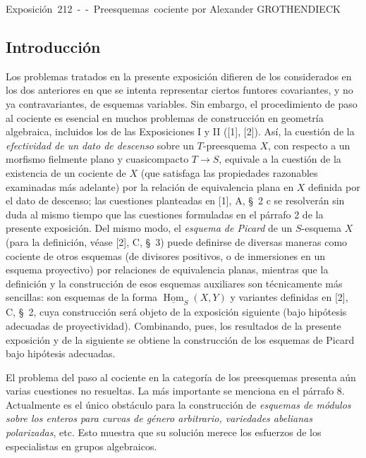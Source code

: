\unit{Exposición 212 -- Preesquemas cociente}
%
  {por Alexander GROTHENDIECK}

\subsection*{Introducción}

Los problemas tratados en la presente exposición difieren de los considerados en
los dos anteriores en que se intenta representar ciertos funtores covariantes,
y no ya contravariantes, de esquemas variables. Sin embargo, el procedimiento
de paso al cociente es esencial en muchos problemas de construcción en
geometría algebraica, incluidos los de las Exposiciones I y II ([1], [2]). Así, la
cuestión de la \emph{efectividad de un dato de descenso} sobre un
$T$-preesquema $X$, con respecto a un morfismo fielmente plano y cuasicompacto
$T\longrightarrow S$, equivale a la cuestión de la existencia de un cociente
de $X$ (que satisfaga las propiedades razonables examinadas más adelante) por
la relación de equivalencia plana en $X$ definida por el dato de descenso; las
cuestiones planteadas en [1], A, \S~2 c se resolverán sin duda al mismo tiempo
que las cuestiones formuladas en el párrafo 2 de la presente exposición. Del mismo
modo, el \emph{esquema de Picard} de un $S$-esquema $X$ (para la definición,
véase [2], C, \S~3) puede definirse de diversas maneras como cociente de otros
esquemas (de divisores positivos, o de inmersiones en un esquema proyectivo)
por relaciones de equivalencia planas, mientras que la definición y la
construcción de esos esquemas auxiliares son técnicamente más sencillas: son
esquemas de la forma $\underline{\operatorname{Hom}}_S(X,Y)$ y variantes
definidas en [2], C, \S~2, cuya construcción será objeto de la exposición siguiente
(bajo hipótesis adecuadas de proyectividad). Combinando, pues, los resultados
de la presente exposición y de la siguiente se obtiene la construcción de los esquemas
de Picard bajo hipótesis adecuadas.

El problema del paso al cociente en la categoría de los preesquemas presenta
aún varias cuestiones no resueltas. La más importante se menciona en el
párrafo 8. Actualmente es el único obstáculo para la construcción de
\emph{esquemas de módulos sobre los enteros para curvas de género arbitrario,
variedades abelianas polarizadas}, etc. Esto muestra que su solución merece
los esfuerzos de los especialistas en grupos algebraicos.

